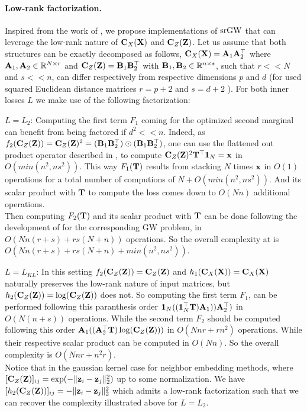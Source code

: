 \paragraph{Low-rank factorization.} Inspired from the work of \citep{scetbon2022linear}, we propose implementations of $\operatorname{srGW}$ that can leverage the low-rank nature of ${\mathbf{C}}_X({\mathbf{X}})$ and ${\mathbf{C}}_Z({\mathbf{Z}})$. Let us assume that both structures can be exactly decomposed as follows, ${\mathbf{C}}_X({\mathbf{X}}) = {\mathbf{A}}_1 {\mathbf{A}}_2^\top$ where ${\mathbf{A}}_1, {\mathbf{A}}_2 \in \mathbb{R}^{N \times r}$ and ${\mathbf{C}}_Z({\mathbf{Z}}) = {\mathbf{B}}_1 {\mathbf{B}}_2^\top$ with ${\mathbf{B}}_1, {\mathbf{B}}_2 \in \mathbb{R}^{n \times s}$, such that $r << N$ and $s << n$, can differ respectively from respective dimensions $p$ and $d$ (\eg for used squared Euclidean distance matrices $r=p+2$ and $s=d +2$ ). For both inner losses $L$ we make use of the following factorization:

\underline{$L=L_2$}: Computing the first term $F_1$ coming for the optimized second marginal can benefit from being factored if $d^2 << n$. Indeed, as $f_2({\mathbf{C}}_Z({\mathbf{Z}})) = {\mathbf{C}}_Z({\mathbf{Z}})^2 = ({\mathbf{B}}_1 {\mathbf{B}}_2^\top) \odot ({\mathbf{B}}_1 {\mathbf{B}}_2^\top)$, one can use the flattened out product operator described in \cite[Section 5]{scetbon2022linear}, to compute ${\mathbf{C}}_Z({\mathbf{Z}})^2 {\mathbf{T}}^\top \bm{1}_N = {\mathbf{x}}$ in $O(min(n^2, ns^2))$. This way $F_1({\mathbf{T}})$ results from stacking $N$ times ${\mathbf{x}}$ in $O(1)$ operations for a total number of computions of $N + O(min(n^2, ns^2))$.%
And its scalar product with ${\mathbf{T}}$ to compute the loss comes down to $O(Nn)$ additional operations. \\
Then computing $F_2({\mathbf{T}})$ and its scalar product with ${\mathbf{T}}$ can be done following the development of \cite[Section 3]{scetbon2022linear} for the corresponding GW problem, in $O(Nn(r + s) + rs(N+n))$ operations. So the overall complexity at is $O(Nn(r + s) + rs(N+n) + min(n^2, ns^2))$.


\underline{$L=L_{KL}$}: In this setting $f_2({\mathbf{C}}_Z({\mathbf{Z}})) = {\mathbf{C}}_Z({\mathbf{Z}})$ and $h_1({\mathbf{C}}_X({\mathbf{X}})) = {\mathbf{C}}_X({\mathbf{X}})$ naturally preserves the low-rank nature of input matrices, but $h_2({\mathbf{C}}_Z({\mathbf{Z}})) = \log({\mathbf{C}}_Z({\mathbf{Z}}))$ does not. So computing the first term $F_1$, can be performed following this paranthesis order $\bm{1}_N ((  \bm{1}_N^\top {\mathbf{T}}) {\mathbf{A}}_1)) {\mathbf{A}}_2^\top) $ in $O(N(n + s))$ operations. While the second term $F_2$ should be computed following this order ${\mathbf{A}}_1 (({\mathbf{A}}_2^\top {\mathbf{T}})  \log({\mathbf{C}}_Z({\mathbf{Z}})))$ in $O(Nnr + rn^2)$ operations. While their respective scalar product can be computed in $O(Nn)$. So the overall complexity is $O(Nnr + n^2r)$.\\
Notice that in the gaussian kernel case for neighbor embedding methods, where $[{\mathbf{C}}_Z({\mathbf{Z}})]_{ij} = \exp(-\|{\mathbf{z}}_i-{\mathbf{z}}_j\|_2^2)$ up to some normalization. We have $[h_2({\mathbf{C}}_Z({\mathbf{Z}}))]_{ij} = -\|{\mathbf{z}}_i-{\mathbf{z}}_j\|_2^2$ which admits a low-rank factorization such that we can recover the complexity illustrated above for $L=L_2$.

